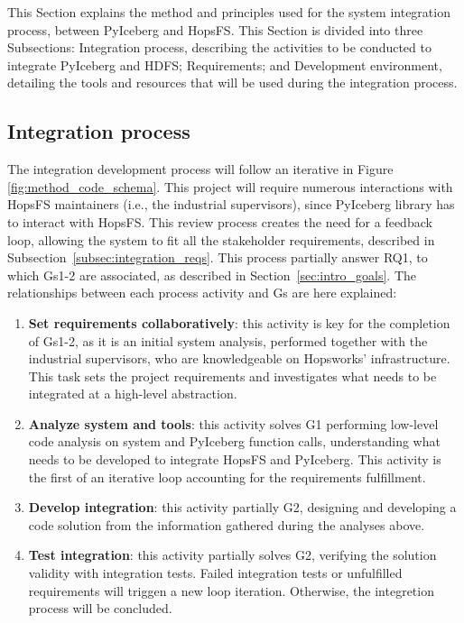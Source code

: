 This Section explains the method and principles used for the system integration process, between PyIceberg and \gls{HopsFS}. This Section is divided into three Subsections: Integration process, describing the activities to be conducted to integrate PyIceberg and \gls{HDFS}; Requirements; and Development environment, detailing the tools and resources that will be used during the integration process.


\subsection{Integration process}
\label{subsec:integration_process}
The integration development process will follow an iterative in Figure \ref{fig:method_code_schema}. This project will require numerous interactions with \gls{HopsFS} maintainers (i.e., the industrial supervisors), since PyIceberg library has to interact with \gls{HopsFS}. This review process creates the need for a feedback loop, allowing the system to fit all the stakeholder requirements, described in Subsection~\ref{subsec:integration_reqs}. This process partially answer \gls{RQ}1, to which \glspl{G}1-2 are associated, as described in Section~\ref{sec:intro_goals}. The relationships between each process activity and \glspl{G} are here explained:

\begin{enumerate}
    \item \textbf{Set requirements collaboratively}: this activity is key for the completion of \glspl{G}1-2, as it is an initial system analysis, performed together with the industrial supervisors, who are knowledgeable on Hopsworks' infrastructure. This task sets the project requirements and investigates what needs to be integrated at a high-level abstraction.
    \item \textbf{Analyze system and tools}: this activity solves \gls{G}1 performing low-level code analysis on system and PyIceberg function calls, understanding what needs to be developed to integrate \gls{HopsFS} and PyIceberg. This activity is the first of an iterative loop accounting for the requirements fulfillment.
    \item \textbf{Develop integration}: this activity partially \gls{G}2, designing and developing a code solution from the information gathered during the analyses above.
    \item \textbf{Test integration}: this activity partially solves \gls{G}2, verifying the solution validity with integration tests. Failed integration tests or unfulfilled requirements will triggen a new loop iteration. Otherwise, the integretion process will be concluded.
\end{enumerate}

